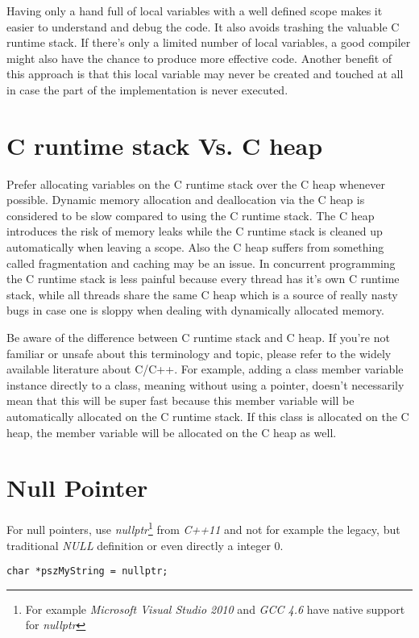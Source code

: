 Having only a hand full of local variables with a well defined scope makes it easier to understand and debug the code. It also avoids trashing the valuable C runtime stack. If there's only a limited number of local variables, a good compiler might also have the chance to produce more effective code. Another benefit of this approach is that this local variable may never be created and touched at all in case the part of the implementation is never executed.




\section{C runtime stack Vs. C heap}
Prefer allocating variables on the C runtime stack over the C heap whenever possible. Dynamic memory allocation and deallocation via the C heap is considered to be slow compared to using the C runtime stack. The C heap introduces the risk of memory leaks while the C runtime stack is cleaned up automatically when leaving a scope. Also the C heap suffers from something called fragmentation and caching may be an issue. In concurrent programming the C runtime stack is less painful because every thread has it's own C runtime stack, while all threads share the same C heap which is a source of really nasty bugs in case one is sloppy when dealing with dynamically allocated memory.

Be aware of the difference between C runtime stack and C heap. If you're not familiar or unsafe about this terminology and topic, please refer to the widely available literature about C/C++. For example, adding a class member variable instance directly to a class, meaning without using a pointer, doesn't necessarily mean that this will be super fast because this member variable will be automatically allocated on the C runtime stack. If this class is allocated on the C heap, the member variable will be allocated on the C heap as well.




\section{Null Pointer}
For null pointers, use \emph{nullptr}\footnote{For example \emph{Microsoft Visual Studio 2010} and \emph{\ac{GCC} 4.6} have native support for \emph{nullptr}} from \emph{C++11} and not for example the legacy, but traditional \emph{NULL} definition or even directly a integer $0$.

\begin{lstlisting}[caption=Null pointer]
char *pszMyString = nullptr;
\end{lstlisting}





